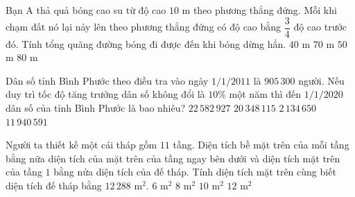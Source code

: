 

\begin{ex}%
	Bạn A thả quả bóng cao su từ độ cao $10$ m theo phương thẳng đứng. Mỗi khi  chạm đất nó lại nảy lên theo phương thẳng đứng có độ cao bằng $\dfrac{3}{4}$ độ cao trước đó. Tính tổng quãng đường bóng đi được đến khi bóng dừng hẳn.
	 \choice
		{$40$  m}
		{\True $70$  m}
		{$50$ m} 
		{$80$ m} 
\end{ex}

\begin{ex}%
	Dân số tỉnh Bình Phước theo điều tra vào ngày $1/1/2011$ là $905\,300$ người. Nếu  duy trì tốc độ tăng trưởng dân số không đổi là $10\%$ một năm thì đến $1/1/2020$ dân số của tỉnh Bình Phước là bao nhiêu?
	\choice 
		 {$22\,582\,927$}
		 {$20\,348\,115$}
		 {\True $2\,134\,650$}
		 {$11\,940\,591$}
\end{ex}

\begin{ex}%
	Người ta thiết kế một cái tháp gồm $11$ tầng. Diện tích bề mặt trên của mỗi tầng bằng nữa diện tích của mặt trên  của tầng ngay bên dưới và diện tích mặt trên của tầng $1$ bằng nửa diện tích của đế tháp. Tính diện tích mặt trên cùng biết diện tích đế tháp bằng $12\,288$ m$^2$.
	\choice 
		{\True $6$ m$^2$} 
		{$8$ m$^2$} 
		{$10$  m$^2$}
		{$12$  m$^2$}
\end{ex}

